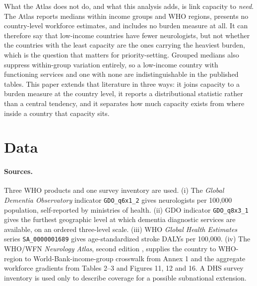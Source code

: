 \documentclass[10pt]{article}
\begin{document}
What the Atlas does not do, and what this analysis adds, is link capacity to
\emph{need}. The Atlas reports medians within income groups and WHO regions,
presents no country-level workforce estimates, and includes no burden measure at
all. It can therefore say that low-income countries have fewer neurologists, but
not whether the countries with the least capacity are the ones carrying the
heaviest burden, which is the question that matters for priority-setting.
Grouped medians also suppress within-group variation entirely, so a low-income
country with functioning services and one with none are indistinguishable in the
published tables. This paper extends that literature in three ways: it joins
capacity to a burden measure at the country level, it reports a distributional
statistic rather than a central tendency, and it separates how much capacity
exists from where inside a country that capacity sits.

%

\section*{Data}

\paragraph{Sources.} Three WHO products and one survey inventory are used.
(i) The \emph{Global Dementia Observatory} \cite{gdo2017} indicator
\texttt{GDO\_q6x1\_2} gives neurologists per 100{,}000 population, self-reported
by ministries of health.
(ii) GDO indicator \texttt{GDO\_q8x3\_1} gives the furthest geographic level at
which dementia diagnostic services are available, on an ordered three-level
scale. (iii) WHO \emph{Global Health Estimates} series \texttt{SA\_0000001689}
\cite{ghe2004} gives age-standardized stroke DALYs per 100{,}000.
(iv) The WHO/WFN \emph{Neurology Atlas}, second edition \cite{atlas2017},
supplies the country to
WHO-region to World-Bank-income-group crosswalk from Annex 1 and the aggregate
workforce gradients from Tables 2--3 and Figures 11, 12 and 16. A DHS survey
inventory is used only to describe coverage for a possible subnational
extension.
\end{document}
